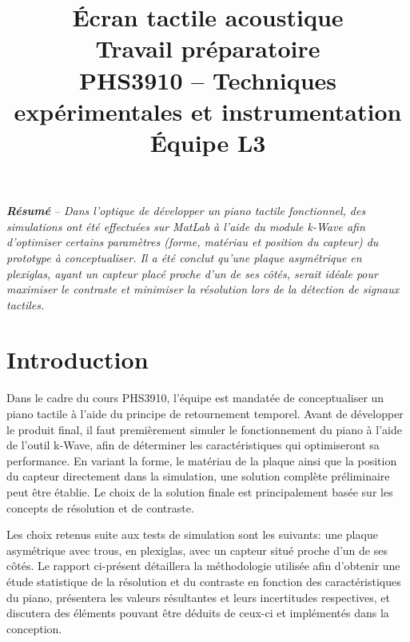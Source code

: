 \documentclass[conference]{IEEEtran}
\begin{document}
\title{Écran tactile acoustique\\
\large Travail préparatoire \\
PHS3910 -- Techniques expérimentales et instrumentation\\ 
Équipe L3}

\author{
\and
{}
\and
{}
\and
{}
}

\maketitle

\textit{\textbf{Résumé} -- Dans l'optique de développer un piano tactile fonctionnel,
des simulations ont été effectuées sur MatLab à l'aide du module k-Wave afin d'optimiser
certains paramètres (forme, matériau et position du capteur) du prototype à conceptualiser. 
Il a été conclut qu'une plaque asymétrique en plexiglas, ayant 
un capteur placé proche d'un de ses côtés, serait idéale pour maximiser le contraste et minimiser la résolution 
lors de la détection de signaux tactiles.}

\section{Introduction}
Dans le cadre du cours PHS3910, l'équipe est mandatée de conceptualiser
un piano tactile à l'aide du principe de retournement temporel. Avant
de développer le produit final, il faut premièrement simuler le fonctionnement 
du piano à l'aide de l'outil k-Wave, afin de déterminer les caractéristiques qui 
optimiseront sa performance. En variant la forme, le matériau de 
la plaque ainsi que la position du capteur directement dans la simulation,
une solution complète préliminaire peut être établie. Le choix de la solution finale est
principalement basée sur les concepts de résolution et de contraste.

Les choix retenus suite aux tests de simulation sont les suivants: une plaque
asymétrique avec trous, en plexiglas, avec un capteur situé proche d'un de ses côtés.
Le rapport ci-présent détaillera la méthodologie utilisée afin d'obtenir 
une étude statistique de la résolution et du contraste en fonction des
caractéristiques du piano, présentera les valeurs résultantes et leurs incertitudes 
respectives, et discutera des éléments pouvant être déduits de ceux-ci et implémentés 
dans la conception.
\end{document}
